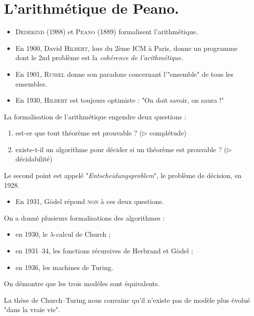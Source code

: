 \documentclass[./main]{subfiles}
\begin{document}
  \chapter{L'arithmétique de Peano.}
  \begin{itemize}
    \item \textsc{Dedekind} (1988) et \textsc{Peano} (1889) formalisent l'arithmétique.
    \item En 1900, David \textsc{Hilbert}, lors du 2ème ICM à Paris, donne un programme dont le 2nd problème est la \textit{cohérence de l'arithmétique}.
    \item En 1901, \textsc{Russel} donne son paradoxe concernant l'"ensemble" de tous les ensembles.
    \item En 1930, \textsc{Hilbert} est toujours optimiste : "On doit savoir, on saura !"
  \end{itemize}

  La formalisation de l'arithmétique engendre deux questions :
  \begin{enumerate}
    \item est-ce que tout théorème est prouvable ? ($\triangleright$ complétude)
    \item existe-t-il un algorithme pour décider si un théorème est prouvable ? ($\triangleright$ décidabilité)
  \end{enumerate}

  Le second point est appelé "\textit{Entscheidungsproblem}", le problème de décision, en 1928.

  \begin{itemize}
    \item En 1931, Gödel répond \textsc{non} à ces deux questions.
  \end{itemize}

  On a donné plusieurs formalisations des algorithmes :
  \begin{itemize}
    \item en 1930, le $\lambda$-calcul de Church ;
    \item en 1931--34, les fonctions récursives de Herbrand et Gödel ;
    \item en 1936, les machines de Turing.
  \end{itemize}
  On démontre que les trois modèles sont équivalents.

  La thèse de Church--Turing nous convainc qu'il n'existe pas de modèle plus évolué "dans la vraie vie".
\end{document}
